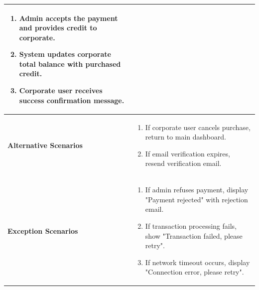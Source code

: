 \begin{longtable}{|p{}|p{}|}
\begin{enumerate}[nosep,leftmargin=*]
      \item Admin accepts the payment and provides credit to corporate.
      \item System updates corporate total balance with purchased credit.
      \item Corporate user receives success confirmation message.
    \end{enumerate} \\ \hline
  \textbf{Alternative Scenarios} &
    \begin{enumerate}[nosep,leftmargin=*]
      \item If corporate user cancels purchase, return to main dashboard.
      \item If email verification expires, resend verification email.
    \end{enumerate} \\ \hline
  \textbf{Exception Scenarios} &
    \begin{enumerate}[nosep,leftmargin=*]
      \item If admin refuses payment, display "Payment rejected" with rejection email.
      \item If transaction processing fails, show "Transaction failed, please retry".
      \item If network timeout occurs, display "Connection error, please retry".
    \end{enumerate} \\ \hline

\end{longtable}

\vspace{1cm}


